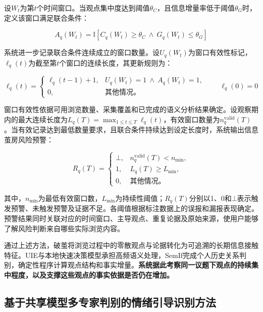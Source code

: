 设\(W_t\)为第\(t\)个时间窗口。当观点集中度达到阈值\(\theta_C\)，且信息增量率低于阈值\(\theta_G\)时，定义该窗口满足联合条件：

\begin{equation}
A_q(W_t)=\mathbb I\left[C_q(W_t)\geq\theta_C\ \land\ G_q(W_t)\leq\theta_G\right]
\label{eq:2-8}
\end{equation}

系统进一步记录联合条件连续成立的窗口数量。设\(U_q(W_t)\)为窗口有效性标记，\(\ell_q(t)\)为截至第\(t\)个窗口的连续长度，其更新规则为：

\begin{equation}
\ell_q(t)=\begin{cases}\ell_q(t-1)+1,&U_q(W_t)=1\ \land\ A_q(W_t)=1,\\0,&\text{其他情况。}\end{cases}\qquad \ell_q(0)=0
\label{eq:2-9}
\end{equation}

窗口有效性依据可用浏览数量、采集覆盖和已完成的语义分析结果确定。设观察期内的最大连续长度为\(L_q(T)=\max_{1\leq t\leq T}\ell_q(t)\)，有效窗口数量为\(n_q^{\mathrm{valid}}(T)\)。当有效记录达到最低数量要求，且联合条件持续达到设定长度时，系统输出信息茧房风险预警：

\begin{equation}
R_q(T)=\begin{cases}\bot,&n_q^{\mathrm{valid}}(T)<n_{\min},\\1,&L_q(T)\geq L_{\min},\\0,&\text{其他情况。}\end{cases}
\label{eq:2-10}
\end{equation}

其中，\(n_{\min}\)为最低有效窗口数，\(L_{\min}\)为持续性阈值；\(R_q(T)\)分别以1、0和\(\bot\)表示触发预警、未触发预警及证据不足。各阈值根据标注数据上的误报和漏报表现确定。预警结果同时关联对应的时间窗口、主导观点、重复论据及原始来源，使用户能够了解风险判断来自哪些实际浏览内容。

通过上述方法，破茧将浏览过程中的零散观点与论据转化为可追溯的长期信息接触特征。UIE与本地快速决策模型承担高频语义处理，SemIf完成个人历史关系判别，确定性程序计算观点结构和事实增量。\textbf{系统据此考察同一议题下观点的持续集中程度，以及支撑这些观点的事实依据是否仍在增加。}

\subsection{基于共享模型多专家判别的情绪引导识别方法}\label{section:2.3}


